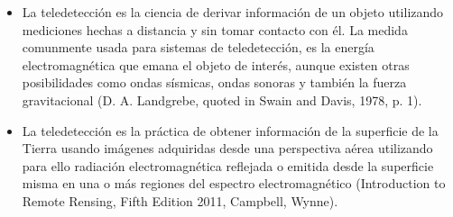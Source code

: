 \begin{itemize}
			\item La teledetecci\'on es la ciencia de derivar informaci\'on de un objeto utilizando mediciones hechas a distancia y sin tomar contacto con \'el. La medida comunmente usada para sistemas de teledetecci\'on, es la energ\'ia electromagn\'etica que emana el objeto de inter\'es, aunque existen otras posibilidades como ondas s\'ismicas, ondas sonoras y tambi\'en la fuerza gravitacional (D. A. Landgrebe, quoted in Swain and Davis, 1978, p. 1).
			\item La teledetecci\'on es la pr\'actica de obtener informaci\'on de la superficie de la Tierra usando im\'agenes adquiridas desde una perspectiva a\'erea utilizando para ello radiaci\'on electromagn\'etica reflejada o emitida desde la superficie misma en una o m\'as regiones del espectro electromagn\'etico (Introduction to Remote Rensing, Fifth Edition 2011, Campbell, Wynne).
		\end{itemize}